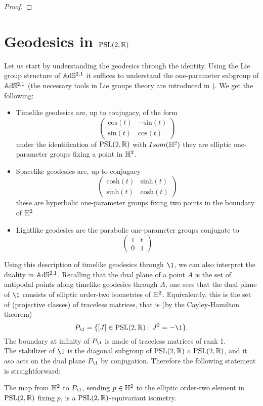 \begin{proof}
\end{proof}


\section{Geodesics in $\text{PSL}(2,\mathbb{R})$}
Let us start by understanding the geodesics through the identity. Using the Lie group structure of $\mathbb{A}\mathrm{d}\mathbb{S}^{2,1}$ it suffices to understand the one-parameter subgroup of $\mathbb{A}\mathrm{d}\mathbb{S}^{2,1}$
(the necessary tools in Lie groups theory are introduced in \cite{bonsanteseppi}). We get the following:
\begin{itemize}
    \item Timelike geodesics are, up to conjugacy, of the form
    \[ \begin{pmatrix}
        \text{cos}(t) & -\text{sin}(t) \\
        \text{sin}(t) & \text{cos}(t)
    \end{pmatrix} \]
    under the identification of $\text{PSL}(2,\mathbb{R})$ with $Isom(\mathbb{H}^2)$ they are elliptic one-parameter groups fixing a point in $\mathbb{H}^2$.
    \item Spacelike geodesics are, up to conjugacy
    \[ \begin{pmatrix}
        \text{cosh}(t) & \text{sinh}(t) \\
        \text{sinh}(t) & \text{cosh}(t)
    \end{pmatrix} \]
    these are hyperbolic one-parameter groups fixing two points in the boundary of $\mathbb{H}^2$
    \item Lightlike geodesics are the parabolic one-parameter groups conjugate to
    \[ \begin{pmatrix}
        1 & t \\
        0 & 1
    \end{pmatrix} \]
\end{itemize}
Using this description of timelike geodesics through $\1$, we can also interpret the duality in $\mathbb{A}\mathrm{d}\mathbb{S}^{2,1}$. Recalling that the dual plane of a point $A$ is the set of antipodal points along timelike geodesics through $A$, one sees that the dual plane of $\1$ consists of elliptic order-two isometries of $\mathbb{H}^2$. Equivalently, this is the set of (projective classes) of traceless matrices, that is (by the Cayley-Hamilton theorem)
\[
    P_\1 = \{ [J]\in\PSL \ | \ J^2 = -\1 \}.
\]
The boundary at infinity of $P_\1$ is made of traceless matrices of rank 1.\\
The stabilizer of $\1$ is the diagonal subgroup of $\text{PSL}(2,\mathbb{R}) \times \text{PSL}(2,\mathbb{R})$, and it aso acts on the dual plane $P_\1$ by conjugation. Therefore the following statement is straightforward:
\begin{lemma}\label{lem:dual plane}
    The map from $\mathbb{H}^2$ to $P_\1$, sending $p\in\mathbb{H}^2$ to the elliptic order-two element in $\text{PSL}(2,\mathbb{R})$ fixing $p$, is a $\text{PSL}(2,\mathbb{R})$-equivariant isometry.
\end{lemma}

